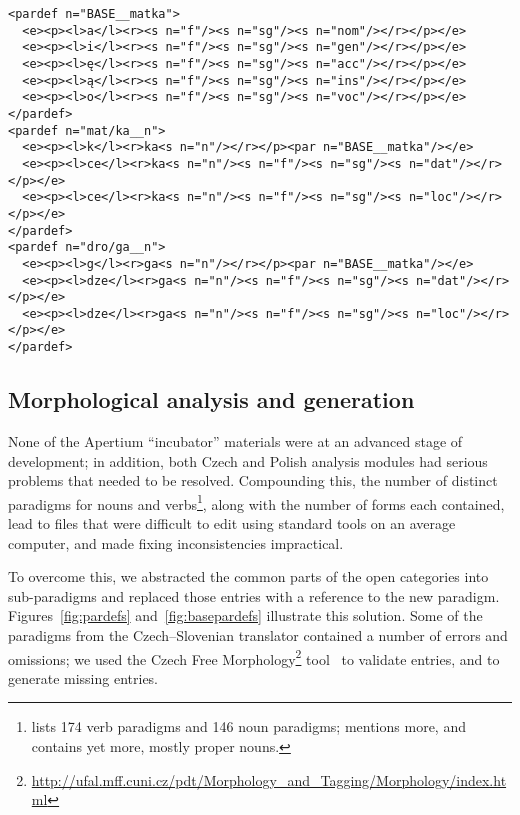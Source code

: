 \documentclass[11pt]{article}
\begin{document}
\begin{figure*}
\begin{small}
\begin{verbatim}
<pardef n="BASE__matka">
  <e><p><l>a</l><r><s n="f"/><s n="sg"/><s n="nom"/></r></p></e>
  <e><p><l>i</l><r><s n="f"/><s n="sg"/><s n="gen"/></r></p></e>
  <e><p><l>ę</l><r><s n="f"/><s n="sg"/><s n="acc"/></r></p></e>
  <e><p><l>ą</l><r><s n="f"/><s n="sg"/><s n="ins"/></r></p></e>
  <e><p><l>o</l><r><s n="f"/><s n="sg"/><s n="voc"/></r></p></e>
</pardef>
<pardef n="mat/ka__n">
  <e><p><l>k</l><r>ka<s n="n"/></r></p><par n="BASE__matka"/></e>
  <e><p><l>ce</l><r>ka<s n="n"/><s n="f"/><s n="sg"/><s n="dat"/></r></p></e>
  <e><p><l>ce</l><r>ka<s n="n"/><s n="f"/><s n="sg"/><s n="loc"/></r></p></e>
</pardef>
<pardef n="dro/ga__n">
  <e><p><l>g</l><r>ga<s n="n"/></r></p><par n="BASE__matka"/></e>
  <e><p><l>dze</l><r>ga<s n="n"/><s n="f"/><s n="sg"/><s n="dat"/></r></p></e>
  <e><p><l>dze</l><r>ga<s n="n"/><s n="f"/><s n="sg"/><s n="loc"/></r></p></e>
</pardef>
\end{verbatim}
\end{small}
\caption{Paradigms for the singular parts of \emph{matka} and \emph{droga}, redefined in terms of 
a ``base paradigm'' containing the common parts of both.
\label{fig:basepardefs} \\
\small{The \textbf{par} element contains a reference to another, previously defined, paradigm.}
}
\end{figure*}

\subsection{Morphological analysis and generation}

None of the Apertium ``incubator'' materials were at an advanced stage of development; in addition, both 
Czech and Polish analysis modules had serious problems that needed to be resolved. Compounding this, the 
number of distinct paradigms for nouns and verbs\footnote{\citet{Jagodzinski08} lists 174 verb 
paradigms and 146 noun paradigms; \citet{Bielec98} mentions more, and \citet{Futrega09}
contains yet more, mostly proper nouns.}, along with the number of forms each 
contained, lead to files that were difficult to edit using standard tools on an average 
computer, and made fixing inconsistencies impractical.

To overcome this, we abstracted the common parts of the open categories into sub-paradigms 
and replaced those entries with a reference to the new paradigm. Figures~\ref{fig:pardefs}
and~\ref{fig:basepardefs} illustrate this solution. Some of the paradigms from the Czech--Slovenian
translator contained a number of errors and omissions; we used the Czech Free 
Morphology\footnote{\url{http://ufal.mff.cuni.cz/pdt/Morphology_and_Tagging/Morphology/index.html}}
tool~\citep{Hacic2004} to validate entries, and to generate missing entries.
\end{document}
